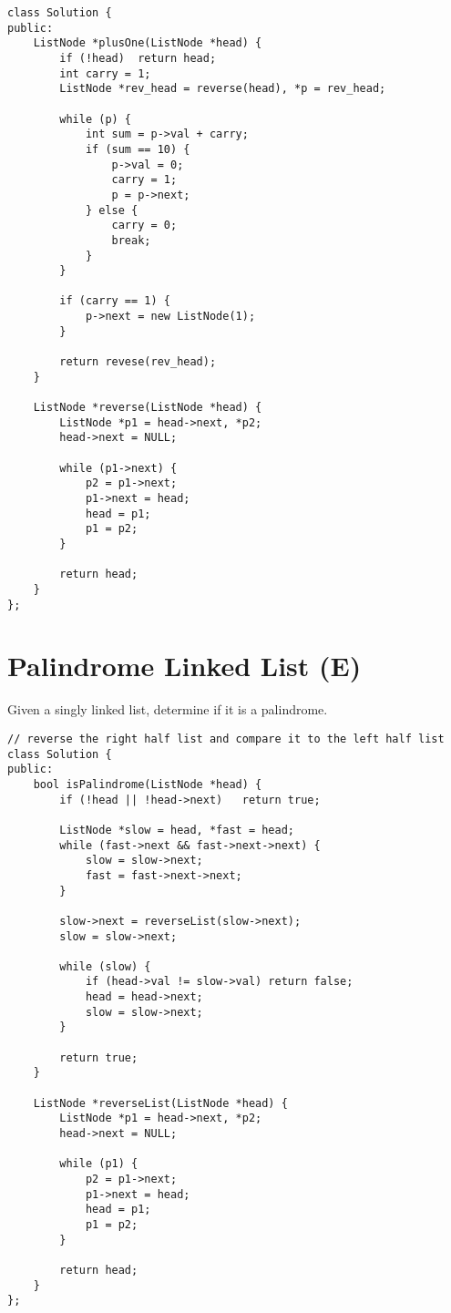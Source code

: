 \begin{lstlisting}
class Solution {
public:
    ListNode *plusOne(ListNode *head) {
        if (!head)  return head;
        int carry = 1;
        ListNode *rev_head = reverse(head), *p = rev_head;
        
        while (p) {
            int sum = p->val + carry;
            if (sum == 10) {
                p->val = 0;
                carry = 1;
                p = p->next;
            } else {
                carry = 0;
                break;
            }
        }
        
        if (carry == 1) {
            p->next = new ListNode(1);
        }
        
        return revese(rev_head);
    }
    
    ListNode *reverse(ListNode *head) {
        ListNode *p1 = head->next, *p2;
        head->next = NULL;
        
        while (p1->next) {
            p2 = p1->next;
            p1->next = head;
            head = p1;
            p1 = p2;
        }
        
        return head;
    }
}; 
\end{lstlisting}


\section{Palindrome Linked List (E)}
Given a singly linked list, determine if it is a palindrome. \\

\lstset{language=C++}
\begin{lstlisting}
// reverse the right half list and compare it to the left half list
class Solution {
public:
    bool isPalindrome(ListNode *head) {
        if (!head || !head->next)   return true;
        
        ListNode *slow = head, *fast = head;
        while (fast->next && fast->next->next) {
            slow = slow->next;
            fast = fast->next->next;
        }
        
        slow->next = reverseList(slow->next);
        slow = slow->next;
        
        while (slow) {
            if (head->val != slow->val) return false;
            head = head->next;
            slow = slow->next;
        }
        
        return true;
    }
    
    ListNode *reverseList(ListNode *head) {
        ListNode *p1 = head->next, *p2;
        head->next = NULL;
        
        while (p1) {
            p2 = p1->next;
            p1->next = head;
            head = p1;
            p1 = p2;
        }
        
        return head;
    }
};
\end{lstlisting} 


